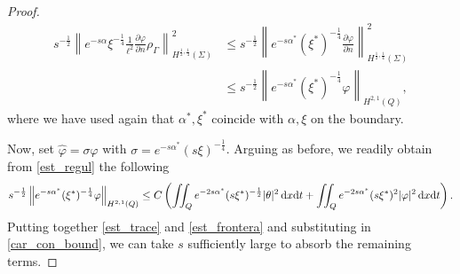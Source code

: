 \documentclass{aims}
\theoremstyle{definition}
\def\csbd{\rho_{\Gamma}}
\def\dx{\,\textnormal{d}x}
\def\dt{\textnormal{d}t}
\begin{document}
\begin{proof}
\begin{equation}\label{est_trace}
\begin{split}
s^{-\frac{1}{2}}\left\|e^{-s\alpha}\xi^{-\frac{1}{4}} \frac{1}{\ell^2} \frac{\partial \varphi}{\partial n}\csbd \right\|^2_{H^{\frac{1}{2},\frac{1}{4}}(\Sigma)} & \leq s^{-\frac{1}{2}}\left\|e^{-s\alpha^*}(\xi^*)^{-\frac{1}{4}} \frac{\partial \varphi}{\partial n} \right\|^2_{H^{\frac{1}{2},\frac{1}{4}}(\Sigma)} \\
&\leq s^{-\frac{1}{2}}\left\| e^{-s\alpha^*}(\xi^*)^{-\frac{1}{4}} \varphi \right\|_{H^{2,1}(Q)},
\end{split}
\end{equation}
%
where we have used again that $\alpha^*,\xi^*$ coincide with $\alpha,\xi$ on the boundary. 

Now, set $\widehat \varphi=\sigma \varphi$ with $\sigma=e^{-s\alpha^*}(s\xi)^{-\frac{1}{4}}$. Arguing as before, we readily obtain from \eqref{est_regul} the following 
%
\begin{equation}\label{est_frontera}
s^{-\frac{1}{2}}\left\| e^{-s\alpha^*}(\xi^*)^{-\frac{1}{4}} \varphi \right\|_{H^{2,1}(Q)}\leq C\left(\iint_{Q}e^{-2s\alpha^*}(s\xi^*)^{-\frac{1}{2}}|\theta|^2\dx\dt+\iint_{Q}e^{-2s\alpha^*}(s\xi^*)^2|\varphi|^2\dx\dt\right).
\end{equation}
%
Putting together \eqref{est_trace} and \eqref{est_frontera} and substituting in \eqref{car_con_bound}, we can take $s$ sufficiently large to absorb the remaining terms. 


\end{proof}
\end{document}
